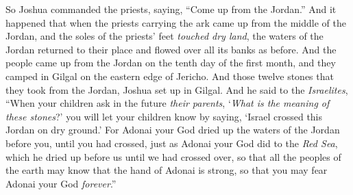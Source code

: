 \begin{biblechapter}
\verse So Joshua commanded the priests, saying, “Come up from the Jordan.”
\verse And it happened that when the priests carrying the ark came up from the middle of the Jordan, and the soles of the priests’ feet \textit{touched dry land}, the waters of the Jordan returned to their place and flowed over all its banks as before.
\verse And the people came up from the Jordan on the tenth day of the first month, and they camped in Gilgal on the eastern edge of Jericho.
\verse And those twelve stones that they took from the Jordan, Joshua set up in Gilgal.
\verse And he said to the \textit{Israelites}, “When your children ask in the future \textit{their parents}, ‘\textit{What is the meaning of these stones}?’
\verse you will let your children know by saying, ‘Israel crossed this Jordan on dry ground.’
\verse For Adonai your God dried up the waters of the Jordan before you, until you had crossed, just as Adonai your God did to the \textit{Red Sea}, which he dried up before us until we had crossed over,
\verse so that all the peoples of the earth may know that the hand of Adonai is strong, so that you may fear Adonai your God \textit{forever}.”
\end{biblechapter}

